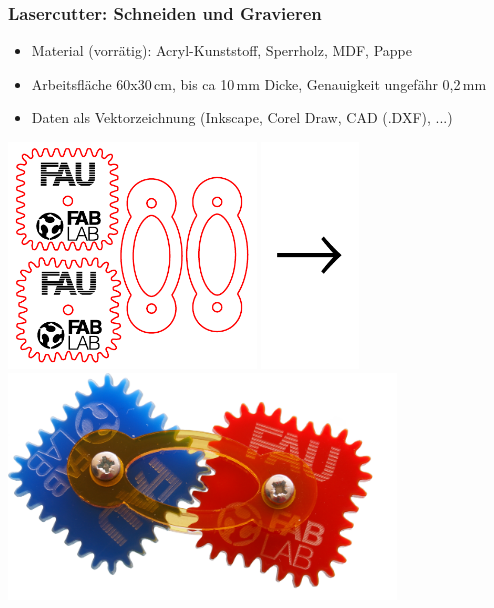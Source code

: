 \documentclass[t]{beamer}
\begin{document}
\begin{frame}
	\frametitle{Lasercutter: Schneiden und Gravieren}
	\begin{itemize}
		\item Material (vorrätig): Acryl-Kunststoff, Sperrholz, MDF, Pappe
		\item Arbeitsfläche 60x30\,cm, bis ca 10\,mm Dicke, Genauigkeit ungefähr 0,2\,mm
		\item Daten als Vektorzeichnung (Inkscape, Corel Draw, CAD (.DXF), ...)
	\end{itemize}
	
	\bigskip
	
	\bigskip
	\begin{center}
		\includegraphics[height=6cm]{../img/SquareGears.pdf}
		\includegraphics[height=6cm]{../img/pfeil.pdf}
		\includegraphics[height=6cm]{../img/zahnraeder2b-skaliert.png}
	\end{center}

\end{frame}
\end{document}
